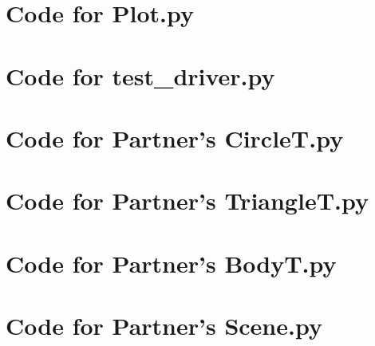 \documentclass[12pt]{article}
\begin{document}
\noindent 

\newpage

\section{Code for Plot.py}

\noindent 

\newpage

\section{Code for test\_driver.py}

\noindent 

\newpage

\section{Code for Partner's CircleT.py}

\noindent 

\newpage

\section{Code for Partner's TriangleT.py}

\noindent 

\newpage

\section{Code for Partner's BodyT.py}

\noindent 

\newpage

\section{Code for Partner's Scene.py}

\noindent 

\newpage
\end{document}
